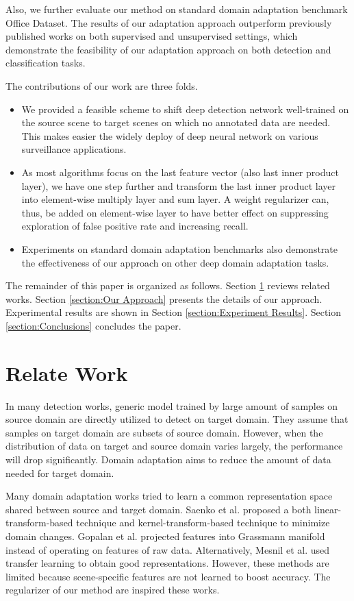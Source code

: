 \documentclass[runningheads]{llncs}
\begin{document}
\par
Also, we further evaluate our method on standard domain adaptation benchmark Office Dataset. The results of our adaptation approach outperform previously published works on both supervised and unsupervised settings, which demonstrate the feasibility of our adaptation approach on both detection and classification tasks.
\par
The contributions of our work are three folds.
\begin{itemize}
\item We provided a feasible scheme to shift deep detection network well-trained on the source scene to target scenes on which no annotated data are needed. This makes easier the widely deploy of deep neural network on various surveillance applications.
\item As most algorithms focus on the last feature vector (also last inner product layer), we have one step further and transform the last inner product layer into element-wise multiply layer and sum layer. A weight regularizer can, thus, be added on element-wise layer to have better effect on suppressing exploration of false positive rate and increasing recall.
\item Experiments on standard domain adaptation benchmarks also demonstrate the effectiveness of our approach on other deep domain adaptation tasks.
\end{itemize}

The remainder of this paper is organized as follows. Section \ref{section:Relate Work} reviews related works. Section \ref{section:Our Approach} presents the details of our approach. Experimental results are shown in Section \ref{section:Experiment Results}. Section \ref{section:Conclusions} concludes the paper.

\section{Relate Work}
\label{section:Relate Work}
\par
In many detection works, generic model trained by large amount of samples on source domain are directly utilized to detect on target domain. They assume that samples on target domain are subsets of source domain. However, when the distribution of data on target and source domain varies largely, the performance will drop significantly. Domain adaptation aims to reduce the amount of data needed for target domain.

Many domain adaptation works tried to learn a common representation space shared between source and target domain. Saenko et al. \cite{saenko2010adapting,kulis2011you} proposed a both linear-transform-based technique and kernel-transform-based technique to minimize domain changes. Gopalan et al. \cite{gopalan2011domain} projected features into Grassmann manifold instead of operating on features of raw data. Alternatively, Mesnil et al. \cite{mesnil2012unsupervised} used transfer learning to obtain good representations. However, these methods are limited because scene-specific features are not learned to boost accuracy. The regularizer of our method are inspired these works.
\end{document}
